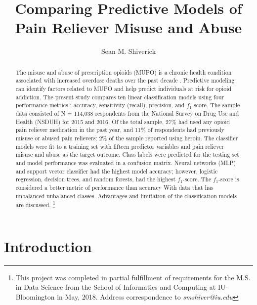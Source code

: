 \documentclass[sigconf]{acmart}
\begin{document}
  \title{Comparing Predictive Models of Pain Reliever Misuse and Abuse}
  \author{Sean M. Shiverick}
\renewcommand{\shortauthors}{S.M. Shiverick}


\begin{abstract}

The misuse and abuse of prescription opioids (MUPO) is a chronic health 
condition associated with increased overdose deaths over the past decade
\cite{nida18}. Predictive modeling can identify factors related to MUPO and 
help predict individuals at risk for opioid addiction. The present study 
compares ten linear classification models using four performance metrics 
: accuracy, sensitivity (recall), precision, and $f_1$-score. The sample 
data consisted of N = 114,038 respondents from the National Survey on Drug 
Use and Health (NSDUH) for 2015 and 2016. Of the total sample, 27\% had 
used any opioid pain reliever medication in the past year, and 11\% of 
respondents had previously misuse or abused pain relievers; 2\% of the 
sample reported using heroin. The classifier models were fit to a training 
set with fifteen predictor variables and pain reliever misuse and abuse as 
the target outcome. Class labels were predicted for the testing set and model 
performance was evaluated in a confusion matrix. Neural networks (MLP) and 
support vector classifier had the highest model accuracy; however, logistic
regression, decision trees, and random forests, had the highest $f_1$-score. 
The $f_1$-score is considered a better metric of performance than accuracy 
With data that has unbalanced unbalanced classes. Advantages and limitation 
of the classification models are discussed. 
\footnote{This project was completed in partial fulfillment of requirements for the M.S. in Data Science from the School of Informatics and Computing at IU-Bloomington in May, 2018. Address correspondence to \textit{smshiver@iu.edu}}

\end{abstract}
\maketitle

\section{Introduction}
\end{document}
